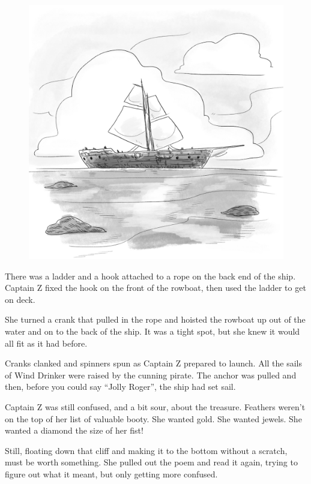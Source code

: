 \documentclass[12pt]{extbook}
\begin{document}
  \begin{figure}[htbp]
  \centering
  \includegraphics{img/wind_drinker.png}
  \caption{}
  \end{figure}
  
  There was a ladder and a hook attached to a rope on the back end of the
  ship. Captain Z fixed the hook on the front of the rowboat, then used
  the ladder to get on deck.
  
  She turned a crank that pulled in the rope and hoisted the rowboat up
  out of the water and on to the back of the ship. It was a tight spot,
  but she knew it would all fit as it had before.
  
  Cranks clanked and spinners spun as Captain Z prepared to launch. All
  the sails of Wind Drinker were raised by the cunning pirate. The anchor
  was pulled and then, before you could say \enquote{Jolly Roger}, the
  ship had set sail.
  
  Captain Z was still confused, and a bit sour, about the treasure.
  Feathers weren't on the top of her list of valuable booty. She wanted
  gold. She wanted jewels. She wanted a diamond the size of her fist!
  
  Still, floating down that cliff and making it to the bottom without a
  scratch, must be worth something. She pulled out the poem and read it
  again, trying to figure out what it meant, but only getting more
  confused.
  
\end{document}
